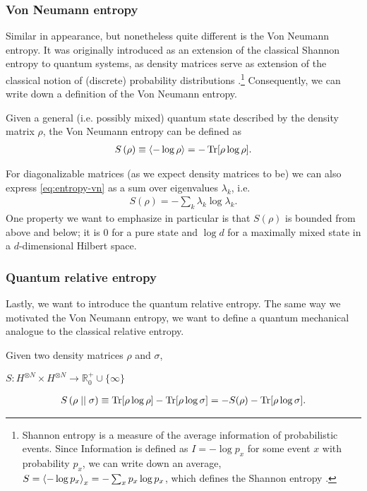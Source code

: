 \subsubsection{Von Neumann entropy}
Similar in appearance, but nonetheless quite different is the Von Neumann
entropy. It was originally introduced as an extension of the classical Shannon
entropy to quantum systems, as density matrices serve as extension of the
classical notion of (discrete) probability distributions
\cite{vonneumannMathematischeGrundlagenQuantenmechanik1968}.\footnote{Shannon
  entropy is a measure of the average information of probabilistic events.
  Since Information is defined as $I=-\log p_x$ for some event $x$ with
  probability $p_x$, we can write down an average, $S = \expval{-\log p_x}_x =
  -\sum_x p_x \log p_x$, which defines the Shannon entropy
\cite{shannonMathematicalTheoryCommunication1948}.}
Consequently, we can write down a definition of the Von Neumann entropy.
\begin{defn}\label{defn:vonneumann}
Given a general (i.e. possibly mixed) quantum state described by the density matrix
$\rho$, the Von Neumann entropy can be defined as
\begin{align}\label{eq:entropy-vn}
  S\left(\rho\right) \equiv \expval{-\log \rho} = -\Tr[\rho\log\rho]
.\end{align}
\end{defn}
For diagonalizable matrices (as we expect density matrices to be) we can also
express \cref{eq:entropy-vn} as a sum over eigenvalues $\lambda_k$, i.e.
\begin{align}
  S\left(\rho\right) = -\sum_k \lambda_k \log \lambda_k
.\end{align}
One property we want to emphasize in particular is that $S(\rho)$ is bounded
from above and below; it is $0$ for a pure state and $\log d$ for a maximally
mixed state in a $d$-dimensional Hilbert space.
\subsubsection{Quantum relative entropy}
Lastly, we want to introduce the quantum relative entropy. The same way we
motivated the Von Neumann entropy, we want to define a quantum mechanical
analogue to the classical relative entropy. 

\begin{defn}\label{defn:rel-ent}
  Given two density matrices $\rho$ and $\sigma$, 

  $S: H^{\otimes N} \times H^{\otimes N} \to \mathbb{R}^+_0 \cup \{\infty\}$

  \begin{align}
    S\left(\rho\mid\mid\sigma\right) \equiv \Tr[\rho\log\rho] -
    \Tr[\rho\log\sigma] = -S(\rho) - \Tr[\rho\log\sigma]
  .\end{align}
\end{defn}


